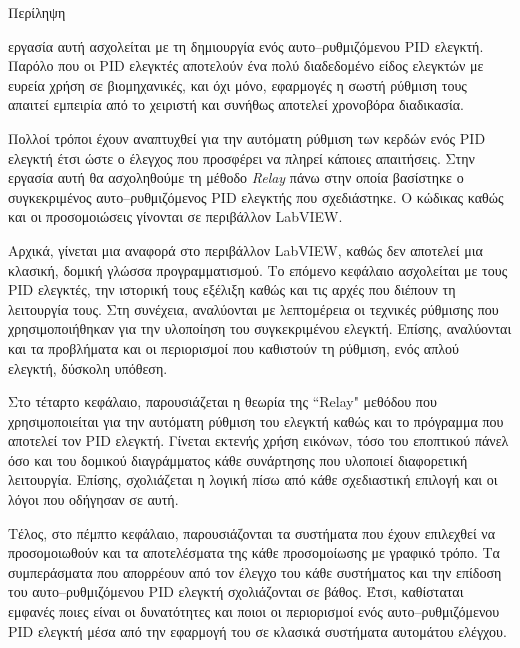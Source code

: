 \pagestyle{plain}
\begin{center}
{\LARGE Περίληψη}\\[1cm]
\end{center}


\lettrine[findent=2pt]{}{ } εργασία αυτή ασχολείται με τη δημιουργία ενός αυτο--ρυθμιζόμενου PID ελεγκτή. Παρόλο που οι PID ελεγκτές αποτελούν ένα πολύ διαδεδομένο είδος ελεγκτών με ευρεία χρήση σε βιομηχανικές, και όχι μόνο, εφαρμογές η σωστή ρύθμιση τους απαιτεί εμπειρία από το χειριστή και συνήθως αποτελεί χρονοβόρα διαδικασία.

Πολλοί τρόποι έχουν αναπτυχθεί για την αυτόματη ρύθμιση των κερδών ενός PID ελεγκτή έτσι ώστε ο έλεγχος που προσφέρει να πληρεί κάποιες απαιτήσεις. Στην εργασία αυτή θα ασχοληθούμε τη μέθοδο \emph{Relay} πάνω στην οποία βασίστηκε ο συγκεκριμένος αυτο--ρυθμιζόμενος PID ελεγκτής που σχεδιάστηκε. Ο κώδικας καθώς και οι προσομοιώσεις γίνονται σε περιβάλλον LabVIEW.

Αρχικά, γίνεται μια αναφορά στο περιβάλλον LabVIEW, καθώς δεν αποτελεί μια κλασική, δομική γλώσσα προγραμματισμού. Το επόμενο κεφάλαιο ασχολείται με τους PID ελεγκτές, την ιστορική τους εξέλιξη καθώς και τις αρχές που διέπουν τη λειτουργία τους. Στη συνέχεια, αναλύονται με λεπτομέρεια οι τεχνικές ρύθμισης που χρησιμοποιήθηκαν για την υλοποίηση του συγκεκριμένου ελεγκτή. Επίσης, αναλύονται και τα προβλήματα και οι περιορισμοί που καθιστούν τη ρύθμιση, ενός απλού ελεγκτή, δύσκολη υπόθεση. 

Στο τέταρτο κεφάλαιο, παρουσιάζεται η θεωρία της ``Relay" μεθόδου που χρησιμοποιείται για την αυτόματη ρύθμιση του ελεγκτή καθώς και το πρόγραμμα που αποτελεί τον PID ελεγκτή. Γίνεται εκτενής χρήση εικόνων, τόσο του εποπτικού πάνελ όσο και του δομικού διαγράμματος κάθε συνάρτησης που υλοποιεί διαφορετική λειτουργία. Επίσης, σχολιάζεται η λογική πίσω από κάθε σχεδιαστική επιλογή και οι λόγοι που οδήγησαν σε αυτή.

Τέλος, στο πέμπτο κεφάλαιο, παρουσιάζονται τα συστήματα που έχουν επιλεχθεί να προσομοιωθούν και τα αποτελέσματα της κάθε προσομοίωσης με γραφικό τρόπο. Τα συμπεράσματα που απορρέουν από τον έλεγχο του κάθε συστήματος και την επίδοση του αυτο--ρυθμιζόμενου PID ελεγκτή σχολιάζονται σε βάθος. Έτσι, καθίσταται εμφανές ποιες είναι οι δυνατότητες και ποιοι οι περιορισμοί ενός αυτο--ρυθμιζόμενου PID ελεγκτή μέσα από την εφαρμογή του σε κλασικά συστήματα αυτομάτου ελέγχου.